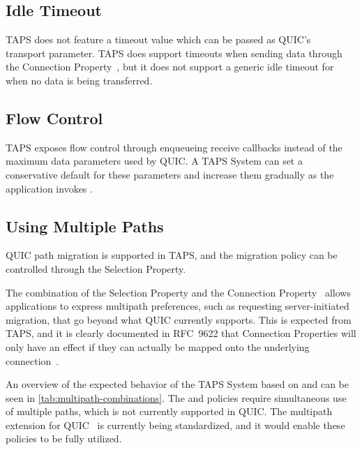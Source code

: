 \subsection{Idle Timeout}
TAPS does not feature a timeout value
which can be passed as QUIC's ~\cite[sec. 10.1]{rfc9000}
transport parameter.
TAPS does support timeouts when sending data through
the  Connection Property~\cite[sec. 8.1.3]{rfc9622}, but
it does not support a generic idle timeout for when no data
is being transferred.

\subsection{Flow Control}
TAPS exposes flow control through enqueueing receive callbacks instead of the
maximum data parameters used by QUIC. A TAPS System can set a conservative
default for these parameters and increase them gradually as the application invokes .

\subsection{Using Multiple Paths}
QUIC path migration is supported in TAPS, and the migration
policy can be controlled through the
 Selection Property.

The combination of the  Selection Property and the  
Connection Property~\cite[sec. 8.1.7]{rfc9622} allows applications to express multipath preferences,
such as requesting server-initiated migration,
that go beyond what QUIC currently supports.
This is expected from TAPS,
and it is clearly documented in RFC~9622 that Connection Properties
will only have an effect if they can actually be mapped onto the
underlying connection~\cite[sec. 5]{rfc9622}. 

An overview of the expected behavior of the TAPS System based
on  and  can be seen in
\cref{tab:multipath-combinations}.
The  and   policies require
simultaneous use of multiple paths, which is not currently supported in QUIC.
The multipath extension for QUIC~\cite{ietf-quic-multipath-21} is currently
being standardized, and it would enable these policies to be fully utilized.

